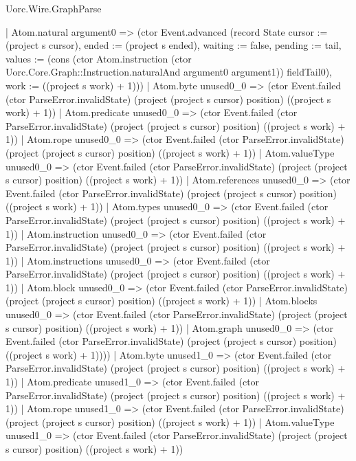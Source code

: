 \begin{lexlean}{Uorc.Wire.GraphParse}
\begin{semanticmodule}
{              | Atom.natural argument0 => (ctor Event.advanced (record State {cursor := (project s cursor), ended := (project s ended), waiting := false, pending := tail, values := (cons (ctor Atom.instruction (ctor Uorc.Core.Graph::Instruction.naturalAnd argument0 argument1)) fieldTail0), work := ((project s work) + 1)}))
              | Atom.byte unused0_0 => (ctor Event.failed (ctor ParseError.invalidState) (project (project s cursor) position) ((project s work) + 1))
              | Atom.predicate unused0_0 => (ctor Event.failed (ctor ParseError.invalidState) (project (project s cursor) position) ((project s work) + 1))
              | Atom.rope unused0_0 => (ctor Event.failed (ctor ParseError.invalidState) (project (project s cursor) position) ((project s work) + 1))
              | Atom.valueType unused0_0 => (ctor Event.failed (ctor ParseError.invalidState) (project (project s cursor) position) ((project s work) + 1))
              | Atom.references unused0_0 => (ctor Event.failed (ctor ParseError.invalidState) (project (project s cursor) position) ((project s work) + 1))
              | Atom.types unused0_0 => (ctor Event.failed (ctor ParseError.invalidState) (project (project s cursor) position) ((project s work) + 1))
              | Atom.instruction unused0_0 => (ctor Event.failed (ctor ParseError.invalidState) (project (project s cursor) position) ((project s work) + 1))
              | Atom.instructions unused0_0 => (ctor Event.failed (ctor ParseError.invalidState) (project (project s cursor) position) ((project s work) + 1))
              | Atom.block unused0_0 => (ctor Event.failed (ctor ParseError.invalidState) (project (project s cursor) position) ((project s work) + 1))
              | Atom.blocks unused0_0 => (ctor Event.failed (ctor ParseError.invalidState) (project (project s cursor) position) ((project s work) + 1))
              | Atom.graph unused0_0 => (ctor Event.failed (ctor ParseError.invalidState) (project (project s cursor) position) ((project s work) + 1))))
          | Atom.byte unused1_0 => (ctor Event.failed (ctor ParseError.invalidState) (project (project s cursor) position) ((project s work) + 1))
          | Atom.predicate unused1_0 => (ctor Event.failed (ctor ParseError.invalidState) (project (project s cursor) position) ((project s work) + 1))
          | Atom.rope unused1_0 => (ctor Event.failed (ctor ParseError.invalidState) (project (project s cursor) position) ((project s work) + 1))
          | Atom.valueType unused1_0 => (ctor Event.failed (ctor ParseError.invalidState) (project (project s cursor) position) ((project s work) + 1))
}
\end{semanticmodule}
\end{lexlean}
